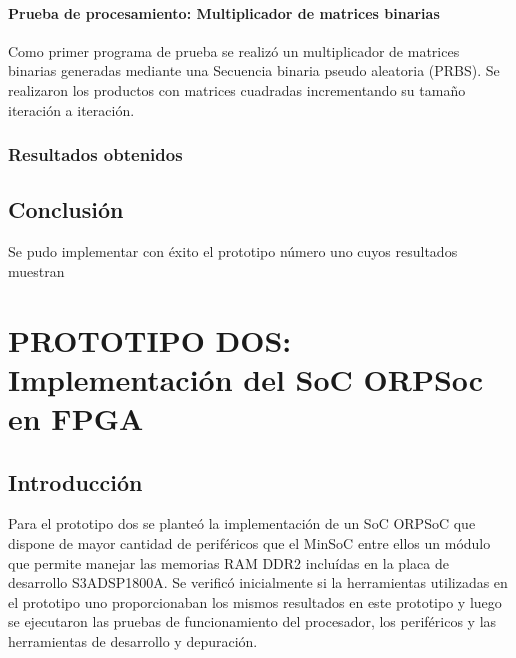 		\paragraph{Prueba de procesamiento: Multiplicador de matrices binarias}
		Como primer programa de prueba se realizó un multiplicador de matrices binarias generadas mediante una Secuencia binaria pseudo aleatoria (PRBS). Se
		realizaron los productos con matrices cuadradas incrementando su tamaño iteración a iteración. 
		
		
		
		\subsubsection{Resultados obtenidos}
		
	
		\subsection{Conclusión}
		Se pudo implementar con éxito el prototipo número uno cuyos resultados muestran
\newpage
		
	\section{PROTOTIPO DOS: Implementación del SoC ORPSoc en FPGA}
		\subsection{Introducción}
		Para el prototipo dos se planteó la implementación de un SoC ORPSoC que dispone de mayor cantidad de periféricos que el MinSoC entre ellos un módulo
		que permite manejar las memorias RAM DDR2 incluídas en la placa de desarrollo S3ADSP1800A. Se verificó inicialmente si la herramientas utilizadas en
		el prototipo uno proporcionaban los mismos resultados en este prototipo y luego se ejecutaron las pruebas de funcionamiento del procesador, los
		periféricos y las herramientas de desarrollo y depuración. 
		
